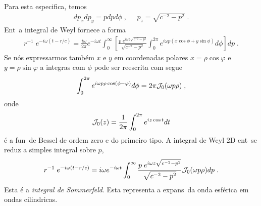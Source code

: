 Para esta especifica\cao, temos
\begin{eqnarray}
dp_x dp_y = p dp d\phi \; , \;\;\;\;\; p_z = \sqrt{c^{-2} - p^2} \; .
\end{eqnarray}
Ent\ao\ a integral de Weyl fornece a forma
\begin{eqnarray}
r^{-1} \; e^{-i\omega(t - r/c)} = \frac{i\omega}{2\pi} e^{-i\omega t}
\int_0^{\infty} \left[ \frac{p \; e^{i\omega z\sqrt{c^{-2}-p^2}}}
{\sqrt{c^{-2}-p^2}} \int_0^{2\pi} e^{i\omega p (x\cos\phi + y\sin\phi)}
d\phi \right] dp \; .
\end{eqnarray}
Se n\'os expressarmos tamb\'em $x$ e $y$ em coordenadas polares
$x=\rho\cos\varphi$ e $y=\rho\sin\varphi$ a integras com $\phi$ pode ser
reescrita com segue
\begin{eqnarray}
\int_0^{2\pi} e^{i\omega p\rho\cos(\phi-\varphi)} d\phi =
2\pi{\cal J}_{0} (\omega p \rho) \; ,
\end{eqnarray}
onde
\begin{eqnarray}
{\cal J}_0(z) = \frac{1}{2\pi} \int_0^{2\pi} e^{iz\cos t} dt
\end{eqnarray}
\'e a fun\cao\ de Bessel de ordem zero e do primeiro tipo. A integral de
Weyl 2D ent\ao\ se reduz a simples integral sobre $p$,
\begin{eqnarray}
r^{-1} \; e^{-i\omega(t - r/c)} = i\omega e^{-i\omega t} \int_0^{\infty}
\frac{p \; e^{i\omega z \sqrt{c^{-2}-p^2}}}{\sqrt{c^{-2}-p^2}}
{\cal J}_0(\omega p\rho) dp \; .
\end{eqnarray}
Esta \'e a {\it integral de Sommerfeld}. Esta representa a expans\ao\ da onda
esf\'erica em ondas cilindricas.

